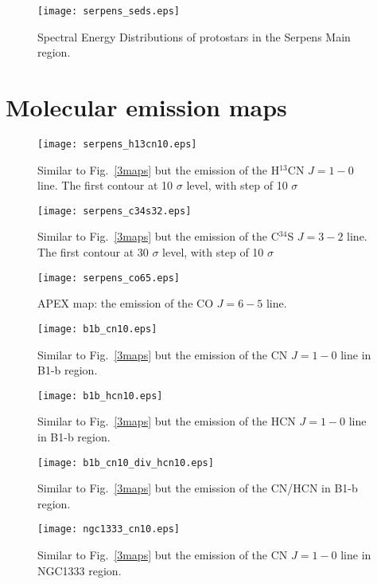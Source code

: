 \documentclass{aa}
\begin{document}
\begin{appendix}
\begin{figure}
   \texttt{[image: serpens\_seds.eps]}
      \caption{Spectral Energy Distributions of protostars in the Serpens Main region.}
         \label{seds}
   \end{figure}

\section{Molecular emission maps}


\begin{figure}
\texttt{[image: serpens\_h13cn10.eps]}
\caption{Similar to Fig.~\ref{3maps} but the emission of the H$^{13}$CN $J=1-0$ line. The first contour at 10 $\sigma$ level, with step of 10 $\sigma$}
\label{serpens_h13cn10}
\end{figure}


\begin{figure}
\texttt{[image: serpens\_c34s32.eps]}
\caption{Similar to Fig.~\ref{3maps} but the emission of the C$^{34}$S $J=3-2$ line. The first contour at 30 $\sigma$ level, with step of 10 $\sigma$}
\label{serpens_c34s32}
\end{figure}

\begin{figure}
\texttt{[image: serpens\_co65.eps]}
\caption{APEX map: the emission of the CO $J=6-5$ line.}
\label{serpens_co65}
\end{figure}

\begin{figure}
\texttt{[image: b1b\_cn10.eps]}
\caption{Similar to Fig.~\ref{3maps} but the emission of the CN $J=1-0$ line in B1-b region. }
\label{b1b_cn}
\end{figure}

\begin{figure}
\texttt{[image: b1b\_hcn10.eps]}
\caption{Similar to Fig.~\ref{3maps} but the emission of the HCN $J=1-0$ line in B1-b region. }
\label{b1b_hcn}
\end{figure}

\begin{figure}
\texttt{[image: b1b\_cn10\_div\_hcn10.eps]}
\caption{Similar to Fig.~\ref{3maps} but the emission of the CN/HCN in B1-b region. }
\label{b1b_cn_div_hcn}
\end{figure}

\begin{figure}
\texttt{[image: ngc1333\_cn10.eps]}
\caption{Similar to Fig.~\ref{3maps} but the emission of the CN $J=1-0$ line in NGC1333 region. }
\label{ngc1333_cn}
\end{figure}


\end{appendix}
\end{document}
